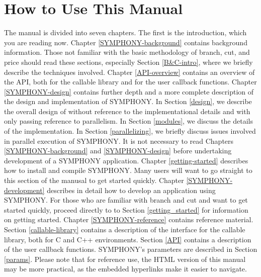 \section{How to Use This Manual}

The manual is divided into seven chapters. The first is the introduction,
which you are reading now. Chapter \ref{SYMPHONY-background} contains
background information. Those not familiar with the basic methodology of
branch, cut, and price should read these sections, especially Section
\ref{B&C-intro}, where we briefly describe the techniques involved. Chapter
\ref{API-overview} contains an overview of the API, both for the callable
library and for the user callback functions. Chapter \ref{SYMPHONY-design}
contains further depth and a more complete description of the design and
implementation of SYMPHONY. In Section \ref{design}, we describe the overall
design of without reference to the implementational details and with only
passing reference to parallelism. In Section \ref{modules}, we discuss the
details of the implementation. In Section \ref{parallelizing}, we briefly
discuss issues involved in parallel execution of SYMPHONY. It is not necessary
to read Chapters \ref{SYMPHONY-background} and \ref{SYMPHONY-design} before
undertaking development of a SYMPHONY application. Chapter
\ref{getting-started} describes how to install and compile SYMPHONY. Many
users will want to go straight to this section of the manusal to get started
quickly. Chapter \ref{SYMPHONY-development} describes in detail how to develop
an application using SYMPHONY. For those who are familiar with branch and cut
and want to get started quickly, proceed directly to to Section
\ref{getting_started} for information on getting started. Chapter
\ref{SYMPHONY-reference} contains reference material. Section
\ref{callable-library} contains a description of the interface for the
callable library, both for C and C++ environments. Section \ref{API} contains
a description of the user callback functions. SYMPHONY's parameters are
described in Section \ref{params}. Please note that for reference use, the
HTML version of this manual may be more practical, as the embedded hyperlinks
make it easier to navigate.
